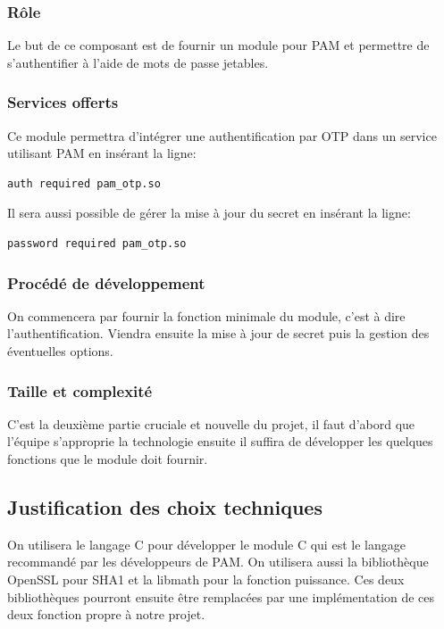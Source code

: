 \documentclass{"../../res/univ-projet"}
\begin{document}
\subsubsection{Rôle}
Le but de ce composant est de fournir un module pour PAM et permettre de s'authentifier
à l'aide de mots de passe jetables.

\subsubsection{Services offerts}
Ce module permettra d'intégrer une authentification par OTP dans un service utilisant PAM
en insérant la ligne:
\begin{verbatim}
auth required pam_otp.so
\end{verbatim}
Il sera aussi possible de gérer la mise à jour du secret en insérant la ligne:
\begin{verbatim}
password required pam_otp.so
\end{verbatim}


\subsubsection{Procédé de développement}
On commencera par fournir la fonction minimale du module, c'est à dire l'authentification. Viendra
ensuite la mise à jour de secret puis la gestion des éventuelles options.

\subsubsection{Taille et complexité}
C'est la deuxième partie cruciale et nouvelle du projet, il faut d'abord que l'équipe s'approprie
la technologie ensuite il suffira de développer les quelques fonctions que le module doit fournir.

\subsection{Justification des choix techniques}
On utilisera le langage C pour développer le module C qui est le langage recommandé par
les développeurs de PAM. On utilisera aussi la bibliothèque OpenSSL pour SHA1 et la libmath
pour la fonction puissance. Ces deux bibliothèques pourront ensuite être remplacées par une implémentation
de ces deux fonction propre à notre projet.

\end{document}

